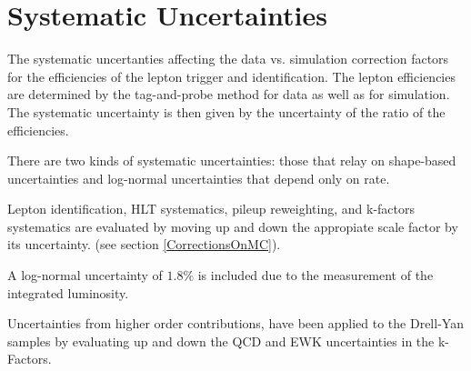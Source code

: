 \section{Systematic Uncertainties}

The systematic uncertanties affecting the data vs. simulation correction factors
for the efficiencies of the lepton trigger and identification. The lepton
efficiencies are determined by the tag-and-probe method \cite{tagandprobe} for data as well as for
simulation. The systematic uncertainty is then given by the uncertainty of
the ratio of the efficiencies.

There are two kinds of systematic uncertainties: those that relay on shape-based
uncertainties and log-normal uncertainties that depend only on rate.

Lepton identification, HLT systematics,
pileup reweighting, and k-factors systematics are evaluated by
moving up and down the appropiate scale factor by its uncertainty.
(see section \ref{CorrectionsOnMC}).

A log-normal uncertainty of $1.8\%$ is included due to the measurement of
the integrated luminosity.

Uncertainties from higher order contributions, have been applied
to the Drell-Yan samples by evaluating up and down the QCD
and EWK uncertainties in the k-Factors.
